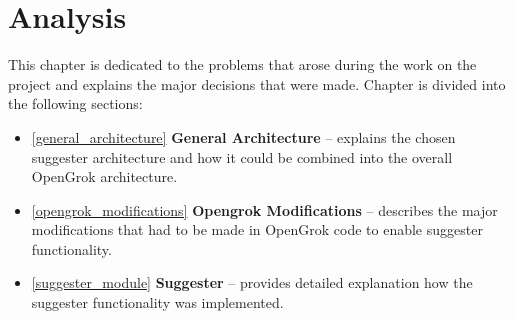 \chapter{Analysis}
\label{chap:analysis}

This chapter is dedicated to the problems that arose during the work on the project and explains the major decisions
that were made. Chapter is divided into the following sections:
\begin{itemize}
    \item \ref{general_architecture} \textbf{General Architecture} – explains the chosen suggester architecture and
    how it could be combined into the overall OpenGrok architecture.
    \item \ref{opengrok_modifications} \textbf{Opengrok Modifications} – describes the major modifications that had
    to be made in OpenGrok code to enable suggester functionality.
    \item \ref{suggester_module} \textbf{Suggester} – provides detailed explanation how the suggester functionality
    was implemented.
\end{itemize}

